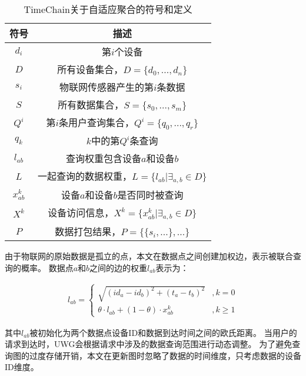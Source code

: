 \begin{table}
    \centering
    \caption{TimeChain关于自适应聚合的符号和定义}
    \begin{tabular}{|c|c|}
        \hline
        \textbf{符号} & \textbf{描述} \\
        \hline
        $d_i$   & 第$i$个设备 \\
        \hline
        $D$     & 所有设备集合，$D = \{d_0, ..., d_n\}$\\
        \hline
        $s_i$   & 物联网传感器产生的第$i$条数据 \\
        \hline
        $S$     & 所有数据集合，$S = \{s_0, ..., s_m \}$\\
        \hline
        $Q^i$   & 第$i$条用户查询集合，$Q^i = \{ q_0, ..., q_r \}$\\
        \hline
        $q_k$   & $k$中的第$Q^i$条查询 \\
        \hline
        $l_{ab}$& 查询权重包含设备$a$和设备$b$ \\
        \hline
        $L$     & 一起查询的数据权重，$L = \{l_{ab} | \exists_{a,b} \in D \}$\\
        \hline
        $x^k_{ab}$ & 设备$a$和设备$b$是否同时被查询 \\
        \hline
        $X^k$   & 设备访问信息，$X^k = \{x^k_{ab} | \exists_{a,b} \in D \}$\\
        \hline
        $P$     & 数据打包结果，$P = \{ \{ s_i, ... \}, ... \}$\\
        \hline
    \end{tabular}
    \label{tab:notations}
\end{table}

由于物联网的原始数据是孤立的点，本文在数据点之间创建加权边，表示被联合查询的概率。
数据点$a$和$b$之间的边的权重$l_{ab}$表示为：

\begin{equation} 
    \label{eq:weight}
    \begin{split}
        l_{ab} =
        \begin{cases}
            \sqrt{ (id_a - id_b)^2 + (t_a - t_b)^2 } &, k = 0 \\  
            \theta \cdot l_{ab} + (1 - \theta) \cdot x_{ab}^k &, k \geq 1  
        \end{cases}
    \end{split}
\end{equation}

其中$l_{ab}$被初始化为两个数据点设备ID和数据到达时间之间的欧氏距离。
当用户的请求到达时，UWG会根据请求中涉及的数据查询范围进行动态调整。
为了避免查询图的过度存储开销，本文在更新图时忽略了数据的时间维度，只考虑数据的设备ID维度。

